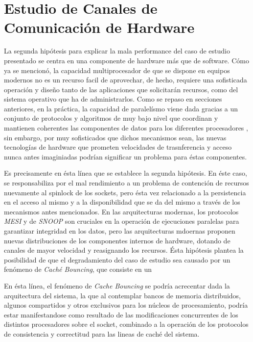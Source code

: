 \section{Estudio de Canales de Comunicación de Hardware}
La segunda hipótesis para explicar la mala performance del caso de estudio presentado se centra en una componente de hardware más que de software. Cómo ya se mencionó, la capacidad multiprocesador de que se dispone en equipos modernos no es un recurso facil de aprovechar, de hecho, requiere una sofisticada operación y diseño tanto de las aplicaciones que solicitarán recursos, como del sistema operativo que ha de administrarlos. Como se repaso en secciones anteriores, en la práctica, la capacidad de paralelísmo viene dada gracias a un conjunto de protocolos y algoritmos de muy bajo nivel que coordinan y mantienen coherentes las componentes de datos para los diferentes procesadores \cite{paper:MESI, paper:snoop}, sin embargo, por muy sofisticados que dichos mecanismos sean, las nuevas tecnologías de hardware que prometen velocidades de trasnferencia y acceso nunca antes imaginiadas podrían significar un problema para éstas componentes.

Es precisamente en ésta línea que se establece la segunda hipótesis. En éste caso, se responsabiliza por el mal rendimiento a un problema de contención de recursos  nuevamente al spinlock de los sockets, pero ésta vez relacionado a la persistencia en el acceso al mismo y a la disponibilidad que se da del mismo a través de los mecanismos antes mencionados. En las arquitecturas modernas, los protocolos \emph{MESI} y de  \emph{SNOOP} son cruciales en la operación de ejecuciones paralelas para garantizar integridad en los datos, pero las arquitecturas mdoernas proponen nuevas distribuciones de los componentes internos de hardware, dotando de canales de mayor velocidad y reasignando los recursos. Ésta hipótesis plantea la posibilidad de que el degradamiento del caso de estudio sea causado por un fenómeno de \emph{Caché Bouncing}, que consiste en un 

En ésta línea, el fenómeno de \emph{Cache Bouncing} se podría acrecentar dada la arquitectura del sistema, la que al contemplar bancos de memoria distribuidos, algunos compartidos y otros exclusivos para los núcleos de procesamiento, podría estar manifestandose como resultado de las modificaciones concurrentes de los distintos procesadores sobre el socket, combinado a la operación de los protocolos de consistencia y correctitud para las lineas de caché del sistema.

